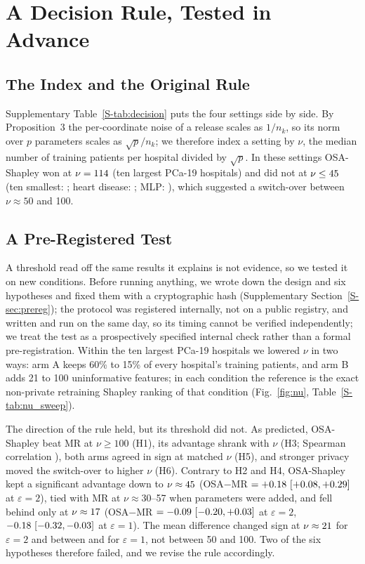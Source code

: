 

\section{A Decision Rule, Tested in Advance}
\label{sec:rule}
\subsection{The Index and the Original Rule}
Supplementary Table~\ref{S-tab:decision} puts the four settings side by side. By Proposition~3 the per-coordinate noise of a release scales as $1/n_k$, so its norm over $p$ parameters scales as $\sqrt p/n_k$; we therefore index a setting by $\nu$, the median number of training patients per hospital divided by $\sqrt p$. In these settings OSA-Shapley won at $\nu=114$ (ten largest PCa-19 hospitals) and did not at $\nu\le45$ (ten smallest: \nuSmall; heart disease: \nuHeart; MLP: \nuMlp), which suggested a switch-over between $\nu\approx50$ and 100.

\subsection{A Pre-Registered Test}
A threshold read off the same results it explains is not evidence, so we tested it on new conditions. Before running anything, we wrote down the design and six hypotheses and fixed them with a cryptographic hash (Supplementary Section~\ref{S-sec:prereg}); the protocol was registered internally, not on a public registry, and written and run on the same day, so its timing cannot be verified independently; we treat the test as a prospectively specified internal check rather than a formal pre-registration. Within the ten largest PCa-19 hospitals we lowered $\nu$ in two ways: arm A keeps 60\% to 15\% of every hospital's training patients, and arm B adds 21 to 100 uninformative features; in each condition the reference is the exact non-private retraining Shapley ranking of that condition (Fig.~\ref{fig:nu}, Table~\ref{S-tab:nu_sweep}).

The direction of the rule held, but its threshold did not. As predicted, OSA-Shapley beat MR at $\nu\ge100$ (H1), its advantage shrank with $\nu$ (H3; Spearman correlation \nsSpear{}), both arms agreed in sign at matched $\nu$ (H5), and stronger privacy moved the switch-over to higher $\nu$ (H6). Contrary to H2 and H4, OSA-Shapley kept a significant advantage down to $\nu\approx45$ (OSA$-$MR $=+0.18\ [+0.08, +0.29]$ at $\varepsilon=2$), tied with MR at $\nu\approx30$--57 when parameters were added, and fell behind only at $\nu\approx17$ (OSA$-$MR $=-0.09\ [-0.20, +0.03]$ at $\varepsilon=2$, $-0.18\ [-0.32, -0.03]$ at $\varepsilon=1$). The mean difference changed sign at $\nu\approx21$ for $\varepsilon=2$ and between \nsCrossOneMin{} and \nsCrossOneMax{} for $\varepsilon=1$, not between 50 and 100. Two of the six hypotheses therefore failed, and we revise the rule accordingly.


